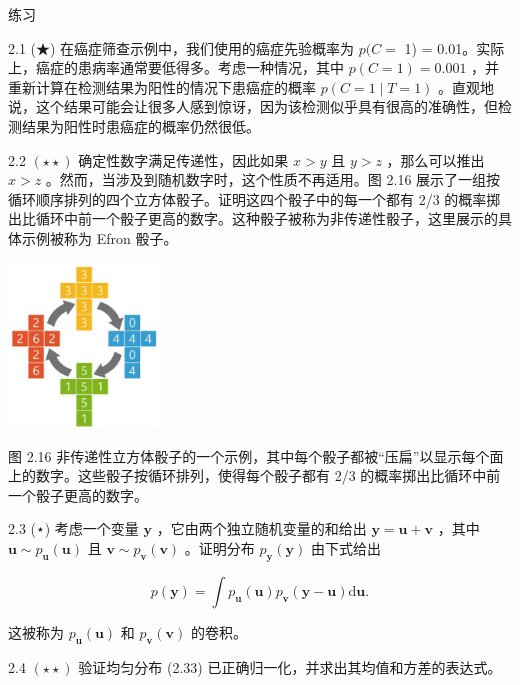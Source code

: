 \documentclass[10pt]{article}
\begin{document}
练习

2.1 (★) 在癌症筛查示例中，我们使用的癌症先验概率为 \(p(C =\) 1) = 0.01。实际上，癌症的患病率通常要低得多。考虑一种情况，其中 \(p\left( {C = 1}\right)  = {0.001}\) ，并重新计算在检测结果为阳性的情况下患癌症的概率 \(p\left( {C = 1 \mid  T = 1}\right)\) 。直观地说，这个结果可能会让很多人感到惊讶，因为该检测似乎具有很高的准确性，但检测结果为阳性时患癌症的概率仍然很低。

2.2 \(\left( {\star  \star  }\right)\) 确定性数字满足传递性，因此如果 \(x > y\) 且 \(y > z\) ，那么可以推出 \(x > z\) 。然而，当涉及到随机数字时，这个性质不再适用。图 2.16 展示了一组按循环顺序排列的四个立方体骰子。证明这四个骰子中的每一个都有 2/3 的概率掷出比循环中前一个骰子更高的数字。这种骰子被称为非传递性骰子，这里展示的具体示例被称为 Efron 骰子。

\begin{center}
\includegraphics[max width=0.3\textwidth]{images/0194e279-9b28-703a-88f4-c3ac21e2010d_77_1048_1104_393_430_0.jpg}
\end{center}
\hspace*{3em} 

图 2.16 非传递性立方体骰子的一个示例，其中每个骰子都被“压扁”以显示每个面上的数字。这些骰子按循环排列，使得每个骰子都有 2/3 的概率掷出比循环中前一个骰子更高的数字。

2.3 (⋆) 考虑一个变量 \(\mathbf{y}\) ，它由两个独立随机变量的和给出 \(\mathbf{y} = \mathbf{u} + \mathbf{v}\) ，其中 \(\mathbf{u} \sim  {p}_{\mathbf{u}}\left( \mathbf{u}\right)\) 且 \(\mathbf{v} \sim  {p}_{\mathbf{v}}\left( \mathbf{v}\right)\) 。证明分布 \({p}_{\mathbf{y}}\left( \mathbf{y}\right)\) 由下式给出

\[
p\left( \mathbf{y}\right)  = \int {p}_{\mathbf{u}}\left( \mathbf{u}\right) {p}_{\mathbf{v}}\left( {\mathbf{y} - \mathbf{u}}\right) \mathrm{d}\mathbf{u}. \tag{2.119}
\]

这被称为 \({p}_{\mathbf{u}}\left( \mathbf{u}\right)\) 和 \({p}_{\mathbf{v}}\left( \mathbf{v}\right)\) 的卷积。

2.4 \(\left( {\star  \star  }\right)\) 验证均匀分布 (2.33) 已正确归一化，并求出其均值和方差的表达式。
\end{document}
